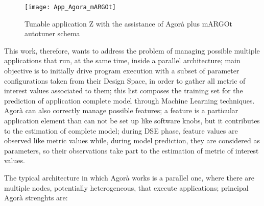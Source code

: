 \begin{figure}[H]

    \centering
    \texttt{[image: App\_Agora\_mARGOt]}
    \caption{Tunable application Z with the assistance of Agorà plus mARGOt autotuner schema}
    \label{fig::appAGORA}
    
\end{figure}

This work, therefore, wants to address the problem of managing possible multiple applications that run, at the same time, inside a parallel architecture; main objective is to initially drive program execution with a subset of parameter configurations taken from their Design Space, in order to gather all metric of interest values associated to them; this list composes the training set for the prediction of application complete model through Machine Learning techniques. Agorà can also correctly manage possible features; a feature is a particular application element than can not be set up like software knobs, but it contributes to the estimation of complete model; during DSE phase, feature values are observed like metric values while, during model prediction, they are considered as parameters, so their observations take part to the estimation of metric of interest values.

The typical architecture in which Agorà works is a parallel one, where there are multiple nodes, potentially heterogeneous, that execute applications; principal Agorà strenghts are:

